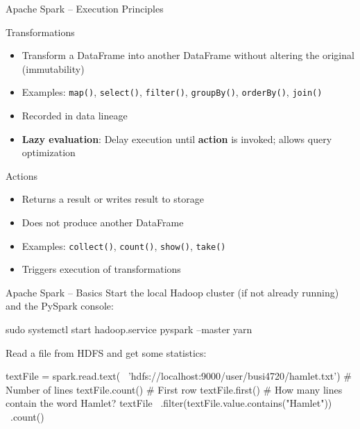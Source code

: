 \documentclass[ignorenonframetext,xcolor=x11names]{beamer}
\begin{document}
\begin{frame}{Apache Spark -- Execution Principles}
\begin{block}{Transformations}
\begin{itemize}
\item Transform a DataFrame into another DataFrame without altering the original (immutability)
\item Examples: \texttt{map()}, \texttt{select()}, \texttt{filter()}, \texttt{groupBy()}, \texttt{orderBy()}, \texttt{join()}
\item Recorded in data lineage
\item \textbf{Lazy evaluation}: Delay execution until \textbf{action} is invoked; allows query optimization
\end{itemize}
\end{block}
\begin{block}{Actions}
\begin{itemize}
\item Returns a result or writes result to storage
\item Does not produce another DataFrame
\item Examples: \texttt{collect()}, \texttt{count()}, \texttt{show()}, \texttt{take()}
\item Triggers execution of transformations
\end{itemize}
\end{block}
\end{frame}

\begin{frame}[fragile]{Apache Spark -- Basics}
Start the local Hadoop cluster (if not already running) and the PySpark console:
\begin{bashcode}
sudo systemctl start hadoop.service
pyspark --master yarn
\end{bashcode}
Read a file from HDFS and get some statistics:
\begin{pythoncode}
textFile = spark.read.text( \
    'hdfs://localhost:9000/user/busi4720/hamlet.txt')
# Number of lines
textFile.count() 
# First row
textFile.first()
# How many lines contain the word Hamlet?
textFile \
    .filter(textFile.value.contains("Hamlet")) \
    .count() 
\end{pythoncode}
\end{frame}
 
\end{document}
